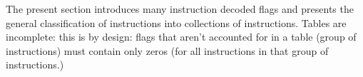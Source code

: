 The present section introduces many instruction decoded flags and presents the general classification of instructions into collections of instructions. Tables are incomplete: this is by design: flags that aren't accounted for in a table (group of instructions) must contain only zeros (for all instructions in that group of instructions.) 